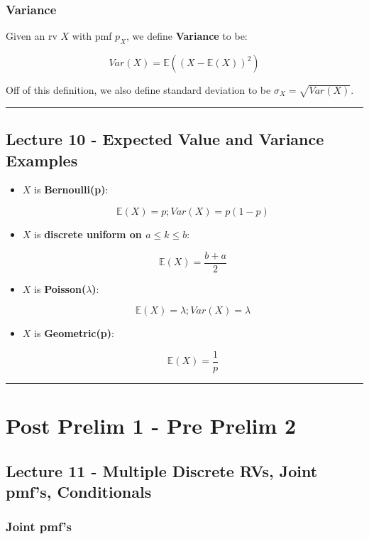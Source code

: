 \documentclass{article}
\begin{document}
\subsubsection{Variance}

Given an rv $X$ with pmf $p_X$, we define \textbf{Variance} to be:

\begin{equation}
  \tag{Variance Def}
  \boxed{
    Var(X) = \mathbb{E}((X - \mathbb{E}(X))^2)
  }
\end{equation}

Off of this definition, we also define standard deviation to be
$\sigma_X = \sqrt{Var(X)}$.


\medskip\hrule
\subsection{Lecture 10 - Expected Value and Variance Examples}

\begin{itemize}
\item $X$ is \textbf{Bernoulli(p)}:

  \[
    \mathbb{E}(X) = p; Var(X) = p(1 - p)
  \]

\item $X$ is \textbf{discrete uniform on $a \le k \le b$}:

  \[
    \mathbb{E}(X) = \frac{b + a}{2}
  \]
  
\item $X$ is \textbf{Poisson($\lambda$)}:

  \[
    \mathbb{E}(X) = \lambda; Var(X) = \lambda
  \]

\item $X$ is \textbf{Geometric(p)}:

  \[
    \mathbb{E}(X) = \frac{1}{p}
  \]
\end{itemize}





\medskip\hrule
\pagebreak
\section{Post Prelim 1 - Pre Prelim 2}

\subsection{Lecture 11 - Multiple Discrete RVs, Joint pmf's,
  Conditionals}

\subsubsection{Joint pmf's}
\end{document}
